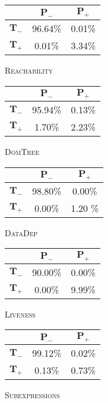 \centering
\scriptsize
\renewcommand{\arraystretch}{1.5}
\begin{subfigure}{.19\linewidth}
  \centering
  \begin{tabular}{r | c c}
    \toprule
    & $\bm{P_-}$ & $\bm{P_+}$ \\
    \midrule
    $\bm{T_-}$ & 96.64\% & 0.01\% \\
    $\bm{T_+}$ & 0.01\% & 3.34\% \\
    \bottomrule
  \end{tabular}
  \caption{\textsc{Reachability}}
\end{subfigure}
\hfill
\begin{subfigure}{.19\linewidth}
  \centering
  \begin{tabular}{r | c c}
    \toprule
    & $\bm{P_-}$ & $\bm{P_+}$ \\
    \midrule
    $\bm{T_-}$ & 95.94\% & 0.13\% \\
    $\bm{T_+}$ & 1.70\% & 2.23\% \\
    \bottomrule
  \end{tabular}
  \caption{\textsc{DomTree}}
\end{subfigure}
\hfill
\begin{subfigure}{.19\linewidth}
  \centering
  \begin{tabular}{r | c c}
    \toprule
    & $\bm{P_-}$ & $\bm{P_+}$ \\
    \midrule
    $\bm{T_-}$ & 98.80\% & 0.00\% \\
    $\bm{T_+}$ & 0.00\% & 1.20 \% \\
    \bottomrule
  \end{tabular}
  \caption{\textsc{DataDep}}
\end{subfigure}
\hfill
\begin{subfigure}{.19\linewidth}
  \centering
  \begin{tabular}{r | c c}
    \toprule
    & $\bm{P_-}$ & $\bm{P_+}$ \\
    \midrule
    $\bm{T_-}$ & 90.00\% & 0.00\% \\
    $\bm{T_+}$ & 0.00\% & 9.99\% \\
    \bottomrule
  \end{tabular}
  \caption{\textsc{Liveness}}
\end{subfigure}
\hfill
\begin{subfigure}{.19\linewidth}
  \centering
  \begin{tabular}{r | c c}
    \toprule
    & $\bm{P_-}$ & $\bm{P_+}$ \\
    \midrule
    $\bm{T_-}$ & 99.12\% & 0.02\% \\
    $\bm{T_+}$ & 0.13\% & 0.73\% \\
    \bottomrule
  \end{tabular}
  \caption{\textsc{Subexpressions}}
\end{subfigure}